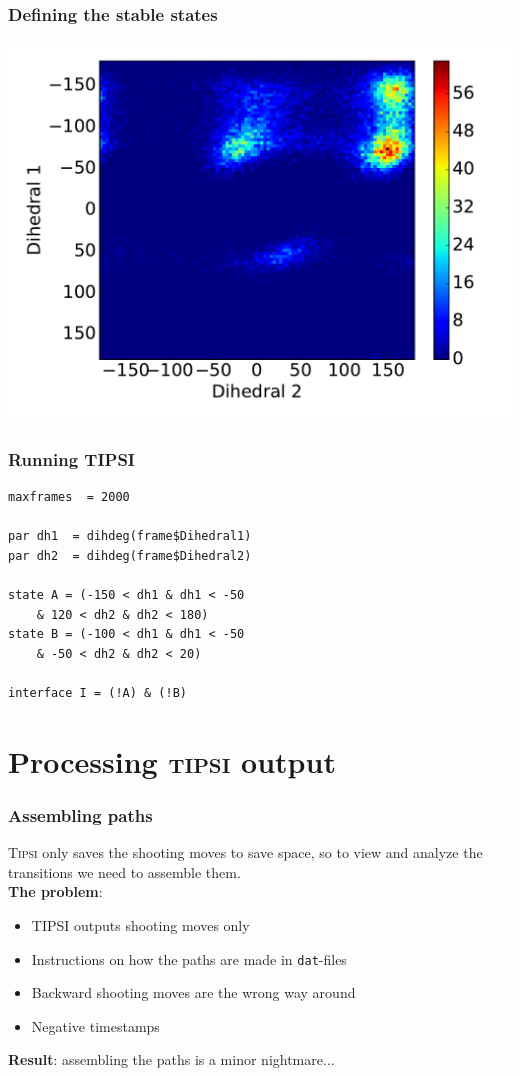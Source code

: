 \documentclass[hyperref={pdfpagelabels=false}]{beamer}
\begin{document}
\begin{frame}
\frametitle{Defining the stable states} 
\begin{center}
\includegraphics[scale=0.4]{images/C_2D.pdf}
\end{center}
\end{frame}

\begin{frame}[fragile]
\frametitle{Running \textsc{TIPSI}}
\begin{lstlisting}
maxframes  = 2000

par dh1  = dihdeg(frame$Dihedral1)
par dh2  = dihdeg(frame$Dihedral2)

state A = (-150 < dh1 & dh1 < -50 
	& 120 < dh2 & dh2 < 180)
state B = (-100 < dh1 & dh1 < -50 
	& -50 < dh2 & dh2 < 20)

interface I = (!A) & (!B)
\end{lstlisting}
\end{frame}

\section{Processing \textsc{tipsi} output}
\setcounter{subsection}{1}

\begin{frame}
\frametitle{Assembling paths}
\textsc{Tipsi} only saves the shooting moves to save space, so to view and analyze the transitions we need to assemble them.\\
\textbf{The problem}: 
\begin{itemize}
\item \textsc{TIPSI} outputs shooting moves only
\item Instructions on how the paths are made in \texttt{dat}-files
\item Backward shooting moves are the wrong way around
\item Negative timestamps
\end{itemize}
\textbf{Result}: assembling the paths is a minor nightmare...
\end{frame}
\end{document}
